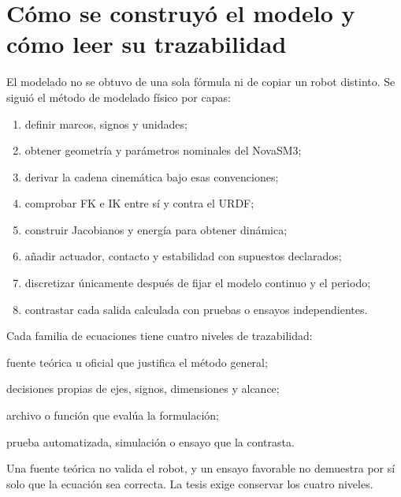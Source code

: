\documentclass[11pt,letterpaper]{article}
\begin{document}
\section{Cómo se construyó el modelo y cómo leer su trazabilidad}
El modelado no se obtuvo de una sola fórmula ni de copiar un robot distinto. Se
siguió el método de modelado físico por capas:
\begin{enumerate}
 \item definir marcos, signos y unidades;
 \item obtener geometría y parámetros nominales del NovaSM3;
 \item derivar la cadena cinemática bajo esas convenciones;
 \item comprobar FK e IK entre sí y contra el URDF;
 \item construir Jacobianos y energía para obtener dinámica;
 \item añadir actuador, contacto y estabilidad con supuestos declarados;
 \item discretizar únicamente después de fijar el modelo continuo y el periodo;
 \item contrastar cada salida calculada con pruebas o ensayos independientes.
\end{enumerate}

Cada familia de ecuaciones tiene cuatro niveles de trazabilidad:
\begin{description}[style=nextline,leftmargin=2.4cm]
 \item[Base T] fuente teórica u oficial que justifica el método general;
 \item[Adaptación A] decisiones propias de ejes, signos, dimensiones y alcance;
 \item[Código C] archivo o función que evalúa la formulación;
 \item[Evidencia E] prueba automatizada, simulación o ensayo que la contrasta.
\end{description}
Una fuente teórica no valida el robot, y un ensayo favorable no demuestra por sí
solo que la ecuación sea correcta. La tesis exige conservar los cuatro niveles.
\end{document}
